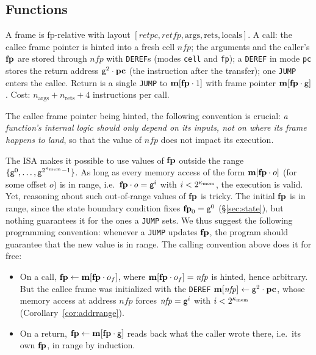 \subsection{Functions}\label{sec:prog-functions}

A frame is fp-relative with layout $[\mathit{retpc},\mathit{retfp},\mathrm{args},\mathrm{rets},\mathrm{locals}]$. A call: the callee frame pointer is hinted into a fresh cell $\mathit{nfp}$; the arguments and the caller's $\mathbf{fp}$ are stored through $\mathit{nfp}$ with \texttt{DEREF}s (modes \texttt{cell} and \texttt{fp}); a \texttt{DEREF} in mode \texttt{pc} stores the return address $\mathsf{g}^{2}\cdot\mathbf{pc}$ (the instruction after the transfer); one \texttt{JUMP} enters the callee. Return is a single \texttt{JUMP} to $\mathbf{m}[\mathbf{fp}\cdot 1]$ with frame pointer $\mathbf{m}[\mathbf{fp}\cdot \mathsf{g}]$. Cost: $n_{\mathrm{args}}+n_{\mathrm{rets}}+4$ instructions per call.

The callee frame pointer being hinted, the following convention is crucial: \textit{a function's internal logic should only depend on its inputs, not on where its frame happens to land}, so that the value of $\mathit{nfp}$ does not impact its execution.

The ISA makes it possible to use values of $\mathbf{fp}$ outside the range $\{\mathsf{g}^{0},\dots,\mathsf{g}^{2^{\kappa_{\mathrm{mem}}}-1}\}$. As long as every memory access of the form $\mathbf{m}[\mathbf{fp}\cdot o]$ (for some offset $o$) is in range, i.e.\ $\mathbf{fp}\cdot o=\mathsf{g}^{i}$ with $i<2^{\kappa_{\mathrm{mem}}}$, the execution is valid. Yet, reasoning about such out-of-range values of $\mathbf{fp}$ is tricky. The initial $\mathbf{fp}$ is in range, since the state boundary condition fixes $\mathbf{fp}_{0}=\mathsf{g}^{0}$ (\S\ref{sec:state}), but nothing guarantees it for the ones a \texttt{JUMP} sets. We thus suggest the following programming convention: whenever a \texttt{JUMP} updates $\mathbf{fp}$, the program should guarantee that the new value is in range. The calling convention above does it for free:

\begin{itemize}
\item On a call, $\mathbf{fp}\gets\mathbf{m}[\mathbf{fp}\cdot o_f]$, where $\mathbf{m}[\mathbf{fp}\cdot o_f]=\mathit{nfp}$ is hinted, hence arbitrary. But the callee frame was initialized with the \texttt{DEREF} $\mathbf{m}[\mathit{nfp}]\gets\mathsf{g}^{2}\cdot\mathbf{pc}$, whose memory access at address $\mathit{nfp}$ forces $\mathit{nfp}=\mathsf{g}^{i}$ with $i<2^{\kappa_{\mathrm{mem}}}$ (Corollary~\ref{cor:addrrange}).
\item On a return, $\mathbf{fp}\gets\mathbf{m}[\mathbf{fp}\cdot \mathsf{g}]$ reads back what the caller wrote there, i.e.\ its own $\mathbf{fp}$, in range by induction.
\end{itemize}

